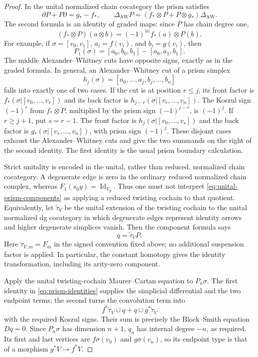 \documentclass[12pt]{amsart}
\theoremstyle{definition}
\theoremstyle{remark}
\numberwithin{equation}{section}
\newcommand{\1}{{\mathbb{1}}}
\newcommand{\id}{\operatorname{Id}}
\begin{document}
\begin{proof}
In the unital normalized chain cocategory the prism satisfies
\begin{equation}\label{eq:prism-identities}
 \partial P+P\partial=g_*-f_*,
 \qquad
 \Delta_{\mathrm{AW}}P
 =
 (f_*\otimes P+P\otimes g_*)\Delta_{\mathrm{AW}}.
\end{equation}
The second formula is an identity of graded maps: since $P$ has chain
degree one,
\[
 (f_*\otimes P)(a\otimes b)
 =
 (-1)^{|a|}f_*(a)\otimes P(b).
\]
For example, if $\sigma=[v_0,v_1]$, $a_i=f(v_i)$, and $b_i=g(v_i)$,
then
\[
 P_1(\sigma)
 =
 [a_0,b_0,b_1]-[a_0,a_1,b_1].
\]
The middle Alexander--Whitney cuts have opposite signs, exactly as in
the graded formula.  In general, an Alexander--Whitney cut of a prism
simplex
\[
 h_j(\sigma)
 =
 [a_0,\ldots,a_j,b_j,\ldots,b_n]
\]
falls into exactly one of two cases.  If the cut is at position
$r\leq j$, its front factor is
$f_*(\sigma|[v_0,\ldots,v_r])$ and its back factor is
$h_{j-r}(\sigma|[v_r,\ldots,v_n])$.  The Koszul sign $(-1)^r$
from $f_*\otimes P$, multiplied by the prism sign
$(-1)^{j-r}$, is $(-1)^j$.  If $r\geq j+1$, put $s=r-1$.
The front factor is
$h_j(\sigma|[v_0,\ldots,v_s])$ and the back factor is
$g_*(\sigma|[v_s,\ldots,v_n])$, with prism sign $(-1)^j$.
These disjoint cases exhaust the Alexander--Whitney cuts and give the
two summands on the right of the second identity.  The first identity
is the usual prism boundary calculation.

Strict unitality is encoded in the unital, rather than reduced,
normalized chain cocategory.  A degenerate edge is zero in the
ordinary reduced normalized chain complex, whereas
$F_1(s_0y)=\id_{V_y}$.  Thus one must not interpret
\eqref{eq:unital-prism-components} as applying a reduced twisting
cochain to that quotient.  Equivalently, let
$\widetilde\tau_V$ be the unital extension of the twisting cochain to
the unital normalized dg cocategory in which degenerate edges
represent identity arrows and higher degenerate simplices vanish.
Then the component formula says
\[
 q=\widetilde\tau_VP.
\]
Here $\widetilde\tau_{V,m}=F_m$ in the signed convention fixed above;
no additional suspension factor is applied.
In particular, the constant homotopy gives the identity
transformation, including its arity-zero component.

Apply the unital twisting-cochain Maurer--Cartan equation to
$P_n\sigma$.
The first identity in \eqref{eq:prism-identities} supplies the
simplicial differential and the two endpoint terms; the second turns
the convolution term into
\[
 f^*\widetilde\tau_V\cup q
 +q\cup g^*\widetilde\tau_V
\]
with the required Koszul signs.  Their sum is precisely the
Block--Smith equation $Dq=0$.  Since $P_n\sigma$ has dimension $n+1$,
$q_n$ has internal degree $-n$, as required.  Its first and last
vertices are $f\sigma(v_0)$ and $g\sigma(v_n)$, so its endpoint type
is that of a morphism $g^*V\to f^*V$.


\end{proof}
\end{document}
